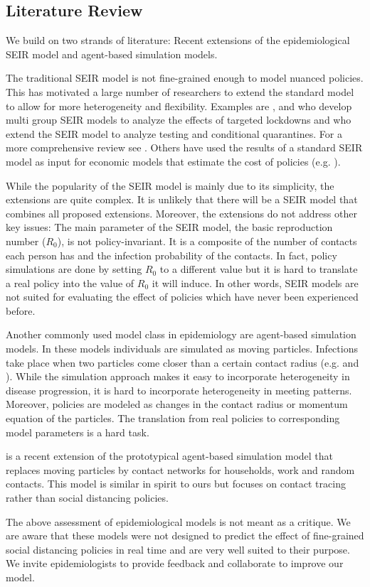 \subsection{Literature Review}
\label{sec:literature_review}

We build on two strands of literature: Recent extensions of the epidemiological SEIR
model and agent-based simulation models.

The traditional SEIR model is not fine-grained enough to model nuanced policies. This
has motivated a large number of researchers to extend the standard model to allow for
more heterogeneity and flexibility. Examples are \citet{Grimm2020},
\citet{Donsimoni2020} and \citet{Acemoglu2020} who develop multi group SEIR models to
analyze the effects of targeted lockdowns and \citet{Berger2020} who extend the SEIR
model to analyze testing and conditional quarantines. For a more comprehensive review
see \citet{Avery2020}. Others have used the results of a standard SEIR model as input
for economic models that estimate the cost of policies (e.g. \citet{Dorn2020}).

While the popularity of the SEIR model is mainly due to its simplicity, the extensions
are quite complex. It is unlikely that there will be a SEIR model that combines all
proposed extensions. Moreover, the extensions do not address other key issues: The main
parameter of the SEIR model, the basic reproduction number ($R_0$), is not
policy-invariant. It is a composite of the number of contacts each person has and the
infection probability of the contacts. In fact, policy simulations are done by setting
$R_0$ to a different value but it is hard to translate a real policy into the value of
$R_0$ it will induce. In other words, SEIR models are not suited for evaluating the
effect of policies which have never been experienced before.

Another commonly used model class in epidemiology are agent-based simulation models. In
these models individuals are simulated as moving particles. Infections take place when
two particles come closer than a certain contact radius (e.g. \citet{Silva2020} and
\citet{Cuevas2020}). While the simulation approach makes it easy to incorporate
heterogeneity in disease progression, it is hard to incorporate heterogeneity in meeting
patterns. Moreover, policies are modeled as changes in the contact radius or momentum
equation of the particles. The translation from real policies to corresponding model
parameters is a hard task.

\citet{Hinch2020} is a recent extension of the prototypical agent-based simulation model
that replaces moving particles by contact networks for households, work and random
contacts. This model is similar in spirit to ours but focuses on contact tracing rather
than social distancing policies.

The above assessment of epidemiological models is not meant as a critique. We are aware
that these models were not designed to predict the effect of fine-grained social
distancing policies in real time and are very well suited to their purpose. We invite
epidemiologists to provide feedback and collaborate to improve our model.
